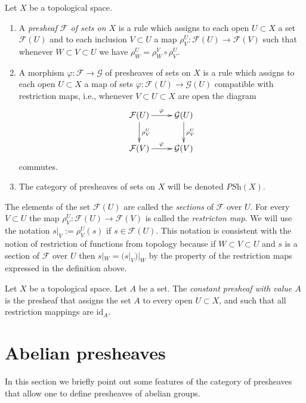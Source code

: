 \begin{definition}
\label{definition-presheaf}
Let $X$ be a topological space.
\begin{enumerate}
\item A {\it presheaf $\mathcal{F}$ of sets on $X$} is a rule which
assigns to each open $U \subset X$ a set $\mathcal{F}(U)$ and
to each inclusion $V \subset U$ a map
$\rho^U_V : \mathcal{F}(U) \to \mathcal{F}(V)$ such that
whenever $W \subset V \subset U$ we have 
$\rho^U_W = \rho^V_W \circ \rho ^U_V$.
\item A morphism $\varphi : \mathcal{F} \to \mathcal{G}$ 
of presheaves of sets on $X$ is a rule which assigns to each
open $U \subset X$ a map of sets $\varphi : \mathcal{F}(U)
\to \mathcal{G}(U)$ compatible with restriction maps,
i.e., whenever $V \subset U \subset X$ are open the
diagram
$$
\xymatrix{
\mathcal{F}(U) \ar[r]^\varphi \ar[d]^{\rho^U_V} &
\mathcal{G}(U) \ar[d]^{\rho^U_V} \cr
\mathcal{F}(V) \ar[r]^\varphi & \mathcal{G}(V)
}
$$
commutes.
\item The category of presheaves of sets on $X$ will be denoted
$\textit{PSh}(X)$.
\end{enumerate}
\end{definition}

\noindent
The elements of the set $\mathcal{F}(U)$ are called
the {\it sections} of $\mathcal{F}$ over $U$.
For every $V \subset U$ the map
$\rho^U_V : \mathcal{F}(U) \to \mathcal{F}(V)$
is called the {\it restricton map}. We will use the
notation $s|_V := \rho^U_V(s)$ if $s\in \mathcal{F}(U)$.
This notation is consistent with the notion of restriction
of functions from topology because if $W \subset V \subset U$
and $s$ is a section of $\mathcal{F}$ over $U$ then
$s|_W = (s|_V)|_W$ by the property of the restriction maps
expressed in the definition above.

\begin{definition}
\label{definition-constant-presheaf}
Let $X$ be a topological space. Let $A$ be a set.
The {\it constant presheaf with value $A$} is the
presheaf that assigns the set $A$ to every open
$U \subset X$, and such that all restriction mappings
are $\text{id}_A$.
\end{definition}

\section{Abelian presheaves}
\label{section-abelian-presheaves}

\noindent
In this section we briefly point out some features of the
category of presheaves that allow one to define presheaves
of abelian groups.

